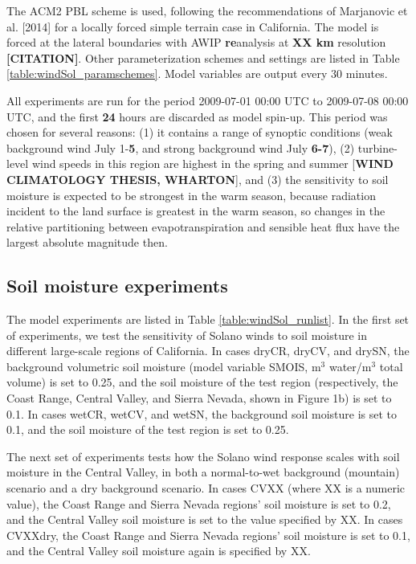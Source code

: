 \documentclass[12pt]{amsart}
\begin{document}
The ACM2 PBL scheme is used, following the recommendations of Marjanovic et al. [2014] for a locally forced simple terrain case in California.  The model is forced at the lateral boundaries with AWIP \textbf{re}analysis at \textbf{XX km} resolution \textbf{[CITATION]}.  Other parameterization schemes and settings are listed in Table \ref{table:windSol_paramschemes}.  Model variables are output every 30 minutes.

All experiments are run for the period 2009-07-01 00:00 UTC to 2009-07-08 00:00 UTC, and the first \textbf{24} hours are discarded as model spin-up.  This period was chosen for several reasons: (1) it contains a range of synoptic conditions (weak background wind July 1-\textbf{5}, and strong background wind July \textbf{6-7}), (2) turbine-level wind speeds in this region are highest in the spring and summer [\textbf{WIND CLIMATOLOGY THESIS, WHARTON}], and (3) the sensitivity to soil moisture is expected to be strongest in the warm season, because radiation incident to the land surface is greatest in the warm season, so changes in the relative partitioning between evapotranspiration and sensible heat flux have the largest absolute magnitude then.

\subsection{Soil moisture experiments}

The model experiments are listed in Table \ref{table:windSol_runlist}.  In the first set of experiments, we test the sensitivity of Solano winds to soil moisture in different large-scale regions of California.  In cases dryCR, dryCV, and drySN, the background volumetric soil moisture (model variable SMOIS, m$^3$ water/m$^3$ total volume) is set to 0.25, and the soil moisture of the test region (respectively, the Coast Range, Central Valley, and Sierra Nevada, shown in Figure 1b) is set to 0.1.  In cases wetCR, wetCV, and wetSN, the background soil moisture is set to 0.1, and the soil moisture of the test region is set to 0.25.

The next set of experiments tests how the Solano wind response scales with soil moisture in the Central Valley, in both a normal-to-wet background (mountain) scenario and a dry background scenario.  In cases CVXX (where XX is a numeric value), the Coast Range and Sierra Nevada regions' soil moisture is set to 0.2, and the Central Valley soil moisture is set to the value specified by XX.  In cases CVXXdry, the Coast Range and Sierra Nevada regions' soil moisture is set to 0.1, and the Central Valley soil moisture again is specified by XX.
\end{document}
